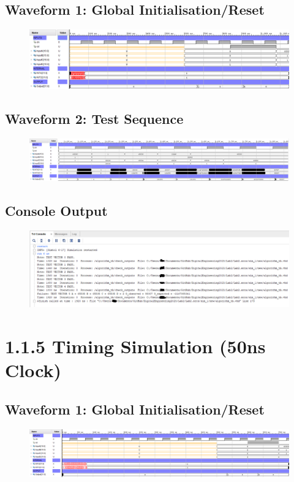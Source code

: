 \documentclass[11pt]{report}
\begin{document}
\subsection*{Waveform 1: Global Initialisation/Reset}
\begin{figure}[H]
    \includegraphics[width=\columnwidth]{Reports/Lab2/Waveforms/120ns_timing_sim-global-reset.png}
\end{figure}
\subsection*{Waveform 2: Test Sequence}
\begin{figure}[H]
    \includegraphics[width=\columnwidth]{Reports/Lab2/Waveforms/120ns_timing_sim-test-sequence.png}
\end{figure}
\subsection*{Console Output}
\begin{figure}[H]
    \includegraphics[width=\columnwidth]{Reports/Lab2/Waveforms/120ns_timing_sim-console.png}
\end{figure}


\section*{1.1.5 Timing Simulation (50ns Clock)}
\subsection*{Waveform 1: Global Initialisation/Reset}
\begin{figure}[H]
    \includegraphics[width=\columnwidth]{Reports/Lab2/Waveforms/50ns_timing_sim-global-reset.png}
\end{figure}
\end{document}
